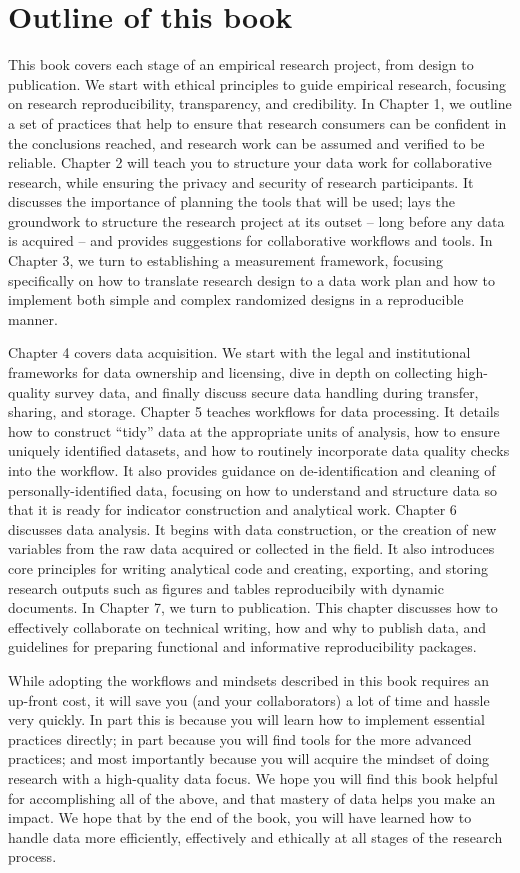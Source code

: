 \section{Outline of this book}

This book covers each stage of an empirical research project, from design to publication.
We start with ethical principles to guide empirical research,
focusing on research reproducibility, transparency, and credibility.
In Chapter 1, we outline a set of practices that help to ensure that
research consumers can be confident in the conclusions reached,
and research work can be assumed and verified to be reliable.
Chapter 2 will teach you to structure your data work for collaborative research, 
while ensuring the privacy and security of research participants.
It discusses the importance of planning the tools that will be used;
lays the groundwork to structure the research project at its outset --
long before any data is acquired -- and provides suggestions for collaborative workflows and tools.
In Chapter 3, we turn to establishing a measurement framework,
focusing specifically on how to translate research design to a data work plan
and how to implement both simple and complex randomized designs in a reproducible manner.

Chapter 4 covers data acquisition. We start with
the legal and institutional frameworks for data ownership and licensing,
dive in depth on collecting high-quality survey data,
and finally discuss secure data handling during transfer, sharing, and storage.
Chapter 5 teaches workflows for data processing.
It details how to construct ``tidy'' data at the appropriate units of analysis,
how to ensure uniquely identified datasets, and
how to routinely incorporate data quality checks into the workflow.
It also provides guidance on de-identification and cleaning of personally-identified data,
focusing on how to understand and structure data
so that it is ready for indicator construction and analytical work.
Chapter 6 discusses data analysis.
It begins with data construction, or the creation of new variables
from the raw data acquired or collected in the field.
It also introduces core principles for writing analytical code
and creating, exporting, and storing research outputs such as figures and tables reproducibily with dynamic documents.
In Chapter 7, we turn to publication.
This chapter discusses
how to effectively collaborate on technical writing,
how and why to publish data,
and guidelines for preparing functional and informative reproducibility packages.


While adopting the workflows and mindsets described in this book requires an up-front cost,
it will save you (and your collaborators) a lot of time and hassle very quickly.
In part this is because you will learn how to implement essential practices directly;
in part because you will find tools for the more advanced practices;
and most importantly because you will acquire the mindset of doing research with a high-quality data focus.
We hope you will find this book helpful for accomplishing all of the above,
and that mastery of data helps you make an impact.
We hope that by the end of the book,
you will have learned how to handle data more efficiently, effectively and ethically
at all stages of the research process.

\mainmatter
